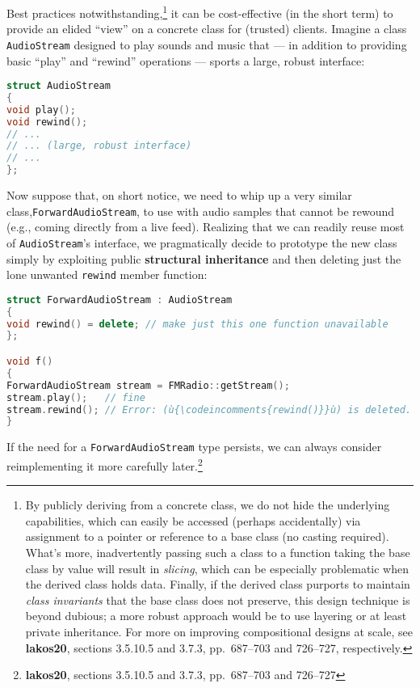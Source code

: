 Best practices notwithstanding,{\cprotect\footnote{By publicly deriving
from a concrete class, we do not hide the underlying capabilities,
which can easily be accessed (perhaps accidentally) via assignment to
a pointer or reference to a base class (no casting required). What's
more, inadvertently passing such a class to a function taking the base
class by value will result in \emph{slicing}, which can be especially
problematic when the derived class holds data. Finally, if the derived
class purports to maintain \emph{class invariants} that the base class
does not preserve, this design technique is beyond dubious; a more
robust approach would be to use layering or at least private
inheritance. For more on improving compositional designs at scale, see
\textbf{{lakos20}}, sections 3.5.10.5 and 3.7.3, pp.~687--703 and
726--727, respectively.}} it can be cost-effective (in the short
term) to provide an elided ``view'' on a concrete class for (trusted)
clients. Imagine a class \texttt{AudioStream} designed to play sounds
and music that --- in addition to providing basic ``play'' and
``rewind'' operations --- sports a large, robust interface:

\begin{lstlisting}[language=C++]
struct AudioStream
{
void play();
void rewind();
// ...
// ... (large, robust interface)
// ...
};
\end{lstlisting}


Now suppose that, on short notice, we need to whip up a very similar
class,\linebreak[4] \texttt{ForwardAudioStream}, to use with audio samples that
cannot be rewound (e.g., coming directly from a live feed). Realizing
that we can readily reuse most of \texttt{AudioStream}'s interface, we
pragmatically decide to prototype the new class simply by exploiting
public \textbf{structural inheritance} and then deleting just the lone
unwanted \texttt{rewind} member function:

\begin{lstlisting}[language=C++]
struct ForwardAudioStream : AudioStream
{
void rewind() = delete; // make just this one function unavailable
};

void f()
{
ForwardAudioStream stream = FMRadio::getStream();
stream.play();   // fine
stream.rewind(); // Error: (ù{\codeincomments{rewind()}}ù) is deleted.
}
\end{lstlisting}

\noindent If the need for a \texttt{ForwardAudioStream} type persists, we can always
consider reimplementing it more carefully later.{\cprotect\footnote{\textbf{{lakos20}}, sections 3.5.10.5 and 3.7.3, pp.~687--703 and 726--727}}

